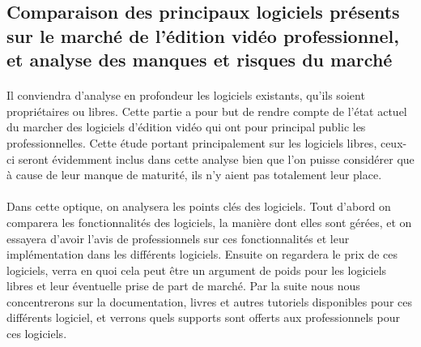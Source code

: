 \subsection{Comparaison des principaux logiciels présents sur le marché de
l'édition vidéo professionnel, et analyse des manques et risques du marché}

\paragraph{}
  Il conviendra d'analyse en profondeur les logiciels existants, qu'ils soient
  propriétaires ou libres. Cette partie a pour but de rendre compte de
  l'état actuel du marcher des logiciels d'édition vidéo qui ont pour principal
  public les professionnelles. Cette étude portant principalement
  sur les logiciels libres, ceux-ci seront évidemment inclus dans cette analyse
  bien que l'on puisse considérer que à cause de leur manque de maturité, ils
  n'y aient pas totalement leur place.

\paragraph{}
  Dans cette optique, on analysera les points clés des logiciels.
  Tout d'abord on comparera les fonctionnalités des
  logiciels, la manière dont elles sont gérées, et on essayera d'avoir l'avis de
  professionnels sur ces fonctionnalités et leur implémentation dans les différents
  logiciels. Ensuite on regardera le prix de ces logiciels, verra en quoi cela
  peut être un argument de poids pour les logiciels libres et leur éventuelle
  prise de part de marché. Par la suite nous nous concentrerons sur la documentation,
  livres et autres tutoriels disponibles pour ces différents logiciel, et verrons
  quels supports sont offerts aux professionnels pour ces logiciels.

